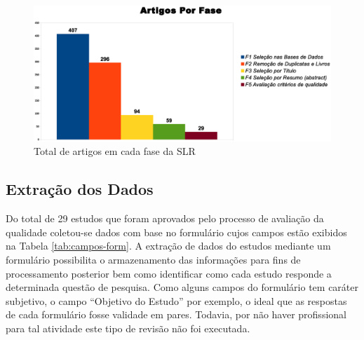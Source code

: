 \documentclass[12pt]{article}
\begin{document}
\begin{figure}[htb]
\centering
\includegraphics[width=.75\textwidth]{../img/graph_fases.eps}
\caption{Total de artigos em cada fase da SLR}
\label{fig:fases}
\end{figure}


\subsection{Extração dos Dados}
\label{subsec:extracao}

Do total de 29 estudos que foram aprovados pelo processo de
avaliação da qualidade coletou-se dados com base no formulário cujos campos
estão exibidos na Tabela \ref{tab:campos-form}. A extração de dados do estudos
mediante um formulário possibilita o armazenamento das informações para fins de
processamento posterior bem como identificar como cada estudo responde a
determinada questão de pesquisa. Como alguns campos do formulário tem caráter
subjetivo, o campo ``Objetivo do Estudo'' por exemplo, o ideal que as respostas
de cada formulário fosse validade em pares. Todavia, por não haver profissional
para tal atividade este tipo de revisão não foi executada.
\end{document}
